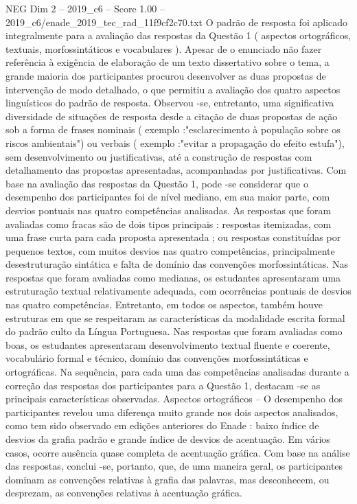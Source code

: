 \begin{textsample}{NEG Dim 2 – 2019\_c6 – Score 1.00 – 2019\_c6/enade\_2019\_tec\_rad\_11f9cf2c70.txt}
O padrão de resposta foi aplicado integralmente para a avaliação das respostas da Questão 1 ( aspectos ortográficos, textuais, morfossintáticos e vocabulares ).
Apesar de o enunciado não fazer referência à exigência de elaboração de um texto dissertativo sobre o tema, a grande maioria dos participantes procurou desenvolver as duas propostas de intervenção de modo detalhado, o que permitiu a avaliação dos quatro aspectos linguísticos do padrão de resposta.
Observou -se, entretanto, uma significativa diversidade de situações de resposta desde a citação de duas propostas de ação sob a forma de frases nominais ( exemplo :"esclarecimento à população sobre os riscos ambientais") ou verbais ( exemplo :"evitar a propagação do efeito estufa"), sem desenvolvimento ou justificativas, até a construção de respostas com detalhamento das propostas apresentadas, acompanhadas por justificativas.
Com base na avaliação das respostas da Questão 1, pode -se considerar que o desempenho dos participantes foi de nível mediano, em sua maior parte, com desvios pontuais nas quatro competências analisadas.
As respostas que foram avaliadas como fracas são de dois tipos principais : respostas itemizadas, com uma frase curta para cada proposta apresentada ; ou respostas constituídas por pequenos textos, com muitos desvios nas quatro competências, principalmente desestruturação sintática e falta de domínio das convenções morfossintáticas.
Nas respostas que foram avaliadas como medianas, os estudantes apresentaram uma estruturação textual relativamente adequada, com ocorrências pontuais de desvios nas quatro competências.
Entretanto, em todos os aspectos, também houve estruturas em que se respeitaram as características da modalidade escrita formal do padrão culto da Língua Portuguesa.
Nas respostas que foram avaliadas como boas, os estudantes apresentaram desenvolvimento textual fluente e coerente, vocabulário formal e técnico, domínio das convenções morfossintáticas e ortográficas.
Na sequência, para cada uma das competências analisadas durante a correção das respostas dos participantes para a Questão 1, destacam -se as principais características observadas.
Aspectos ortográficos – O desempenho dos participantes revelou uma diferença muito grande nos dois aspectos analisados, como tem sido observado em edições anteriores do Enade : baixo índice de desvios da grafia padrão e grande índice de desvios de acentuação.
Em vários casos, ocorre ausência quase completa de acentuação gráfica.
Com base na análise das respostas, conclui -se, portanto, que, de uma maneira geral, os participantes dominam as convenções relativas à grafia das palavras, mas desconhecem, ou desprezam, as convenções relativas à acentuação gráfica.

\end{textsample}
